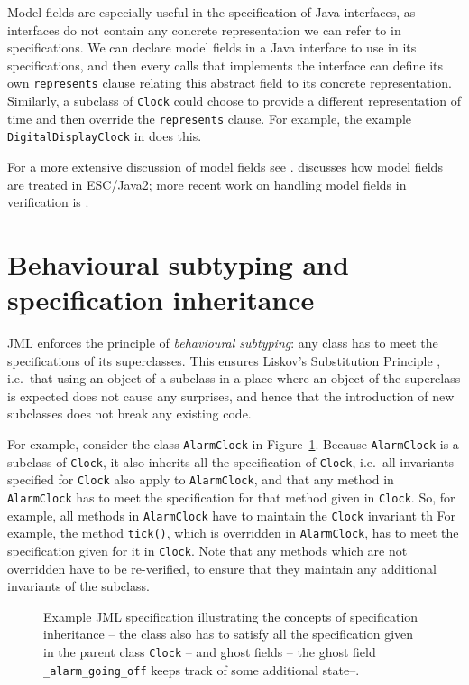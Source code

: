 \documentclass{llncs}
\begin{document}
Model fields are especially useful in the specification of Java interfaces,
as interfaces do not contain any concrete representation we can refer
to in specifications. We can declare model fields in a Java interface
to use in its specifications, and then every calls that implements 
the interface can define its own \texttt{represents} clause relating
this abstract field to its concrete representation. Similarly, a subclass
of \texttt{Clock} could choose to provide a different representation
of time and then override the \texttt{represents} clause. For example,
the example \texttt{DigitalDisplayClock} in 
does this.

For a more extensive discussion of model fields see \cite{Cheon-etal05}.
\cite{Cok05} discusses how model fields are treated in ESC/Java2;
more recent work on handling model fields in verification is \cite{LeinoMuller06}.

\section{Behavioural subtyping and specification inheritance}
\label{Sec:behsubtyping}

JML enforces the principle of \emph{behavioural subtyping}: any class
has to meet the specifications of its superclasses.
This ensures Liskov's Substitution Principle \cite{LiskovWing94},
i.e.\ that using an object of a subclass in a place where an object of 
the superclass is expected does not cause any surprises, and hence that 
the introduction of new subclasses does not break any existing code.

For example, consider the class \texttt{AlarmClock} in Figure~\ref{Example:alarmclock}.
Because \texttt{AlarmClock} is a subclass of \texttt{Clock}, it also
inherits all the specification of \texttt{Clock}, i.e.\ 
all invariants specified for \texttt{Clock} also apply to \texttt{AlarmClock},
and that any method in \texttt{AlarmClock} has to meet the specification
for that method given in  \texttt{Clock}.
So, for example, all methods in \texttt{AlarmClock} have to maintain the
\texttt{Clock} invariant th
For example, the method \texttt{tick()}, which is overridden in \texttt{AlarmClock},
has to meet the specification given for it in \texttt{Clock}. 
Note that any methods which are not overridden have to be re-verified, to ensure 
that they maintain any additional invariants of the subclass.

\begin{figure}[tbp] \label{Example:alarmclock}
%

%
\vspace*{-2ex} %
\caption{Example JML specification illustrating the concepts of 
specification inheritance -- the class also has to satisfy all
the specification given in the parent class \texttt{Clock} -- and 
ghost fields -- the ghost field \texttt{\_alarm\_going\_off}
keeps track of some additional state--.}
\end{figure}
\end{document}
